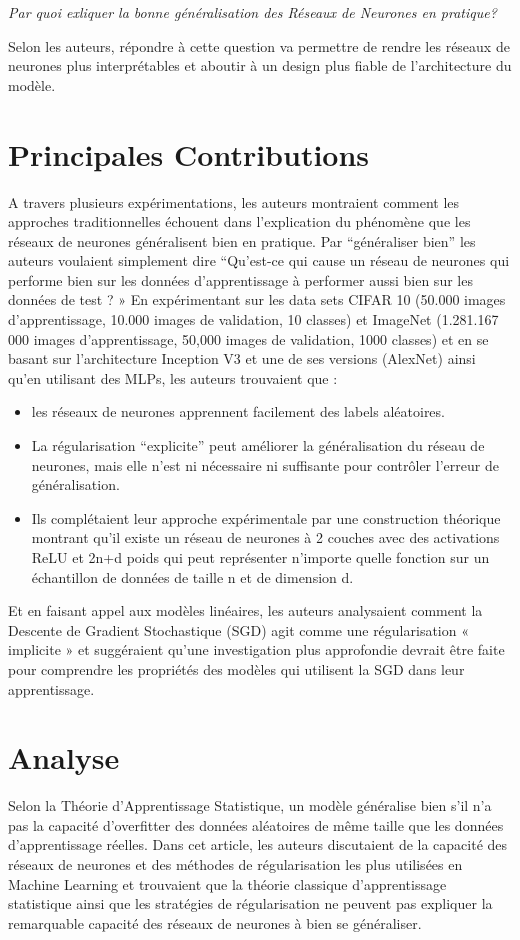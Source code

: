 \documentclass[a4paper,english,12pt]{article}
\begin{document}
\begin{center}

\textit{Par quoi exliquer la bonne généralisation des Réseaux de Neurones en pratique? }

\end{center}
Selon les auteurs, répondre à cette question va permettre de rendre les réseaux de neurones plus interprétables et aboutir à un design plus fiable de l’architecture du modèle. 

\section{Principales Contributions}
A travers plusieurs expérimentations, les auteurs montraient comment les approches traditionnelles échouent dans l’explication du phénomène que les réseaux de neurones généralisent bien en pratique. Par “généraliser bien” les auteurs voulaient simplement dire “Qu’est-ce qui cause un réseau de neurones qui performe bien sur les données d’apprentissage à performer aussi bien sur les données de test ? » 
En expérimentant sur les data sets CIFAR 10 (50.000 images d’apprentissage, 10.000 images de validation, 10 classes) et ImageNet (1.281.167 000 images d’apprentissage, 50,000 images de validation, 1000 classes) et en se basant sur l’architecture Inception V3 et une de ses versions (AlexNet) ainsi qu'en utilisant des MLPs, les auteurs trouvaient que :
\begin{itemize}
\item les réseaux de neurones apprennent facilement des labels aléatoires. 
\item La régularisation “explicite” peut améliorer la généralisation du réseau de neurones, mais elle n’est ni nécessaire ni suffisante pour contrôler l’erreur de généralisation. 
\item Ils complétaient leur approche expérimentale par une construction théorique montrant qu'il existe un réseau de neurones à 2 couches avec des activations ReLU et 2n+d poids qui peut représenter n’importe quelle fonction sur un échantillon de données de taille n et de dimension d. 
\end{itemize}
 
Et en faisant appel aux modèles linéaires, les auteurs analysaient comment la Descente de Gradient Stochastique (SGD) agit comme une régularisation « implicite » et suggéraient qu’une investigation plus approfondie devrait être faite pour comprendre les propriétés des modèles qui utilisent la SGD dans leur apprentissage.
\section{Analyse}
Selon la Théorie d’Apprentissage Statistique, un modèle généralise bien s’il n’a pas la capacité d’overfitter des données aléatoires de même taille que les données d’apprentissage réelles. 
Dans cet article, les auteurs discutaient de la capacité des réseaux de neurones et des méthodes de régularisation les plus utilisées en Machine Learning et trouvaient que la théorie classique d’apprentissage statistique ainsi que les stratégies de régularisation ne peuvent pas expliquer la remarquable capacité des réseaux de neurones à bien se généraliser. 
 
\end{document}
